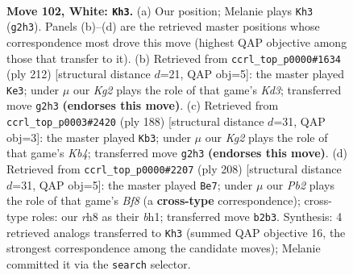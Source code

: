 \documentclass[11pt]{article}
\begin{document}
\clearpage

\begin{figure}[p]\centering
\begin{subfigure}{0.46\textwidth}\centering
\resizebox{\linewidth}{!}{%
\newchessgame
\chessboard[
  setfen={7r/8/p2k4/P1p2p1p/1p3P1P/4P1P1/1P4K1/6R1 w - - 15 102},
  showmover=false,
  pgfstyle=straightmove, color=movearrow, markmove={g2-h3}
]}
\caption{}
\end{subfigure}\hfill
\begin{subfigure}{0.46\textwidth}\centering
\resizebox{\linewidth}{!}{%
\newchessgame
\chessboard[
  setfen={8/2p5/3p2pk/3Pp1p1/2P1P3/1R1K1P1P/5r2/8 w - - 31 107},
  showmover=false,
  pgfstyle=straightmove, color=movearrow, markmove={d3-e3}
]}
\caption{}
\end{subfigure}
\\[4pt]
\begin{subfigure}{0.46\textwidth}\centering
\resizebox{\linewidth}{!}{%
\newchessgame
\chessboard[
  setfen={8/2k5/1p6/1P3p1p/1K1Pp1pP/4P1P1/5P2/8 w - - 14 95},
  showmover=false,
  pgfstyle=straightmove, color=movearrow, markmove={b4-b3}
]}
\caption{}
\end{subfigure}\hfill
\begin{subfigure}{0.46\textwidth}\centering
\resizebox{\linewidth}{!}{%
\newchessgame
\chessboard[
  setfen={5B2/5p1p/4p3/4PpP1/p4P2/P2k2P1/5K2/7b w - - 90 105},
  showmover=false,
  pgfstyle=straightmove, color=movearrow, markmove={f8-e7}
]}
\caption{}
\end{subfigure}
\caption{\textbf{Move 102, White: \texttt{Kh3}.} (a) Our position; Melanie plays \texttt{Kh3} (\texttt{g2h3}). Panels (b)--(d) are the retrieved master positions whose correspondence most drove this move (highest QAP objective among those that transfer to it). (b) Retrieved from \texttt{ccrl\_top\_p0000\#1634} (ply 212) [structural distance $d$=21, QAP obj=5]: the master played \texttt{Ke3}; under $\mu$ our \emph{Kg2} plays the role of that game's \emph{Kd3}; transferred move \texttt{g2h3} \textbf{(endorses this move)}. (c) Retrieved from \texttt{ccrl\_top\_p0003\#2420} (ply 188) [structural distance $d$=31, QAP obj=3]: the master played \texttt{Kb3}; under $\mu$ our \emph{Kg2} plays the role of that game's \emph{Kb4}; transferred move \texttt{g2h3} \textbf{(endorses this move)}. (d) Retrieved from \texttt{ccrl\_top\_p0000\#2207} (ply 208) [structural distance $d$=31, QAP obj=5]: the master played \texttt{Be7}; under $\mu$ our \emph{Pb2} plays the role of that game's \emph{Bf8} (a \textbf{cross-type} correspondence); cross-type roles: our \emph{r}h8 as their \emph{b}h1; transferred move \texttt{b2b3}. Synthesis: 4 retrieved analogs transferred to \texttt{Kh3} (summed QAP objective 16, the strongest correspondence among the candidate moves); Melanie committed it via the \texttt{search} selector.}
\label{fig:thought-m202}
\end{figure}
\end{document}
